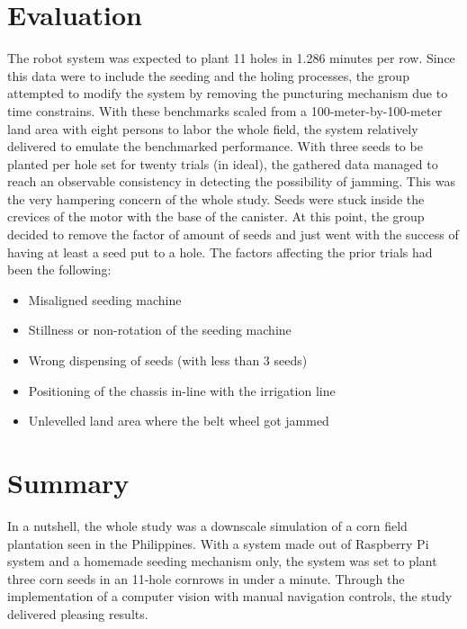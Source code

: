 \section{Evaluation}
	The robot system was expected to plant 11 holes in 1.286 minutes per row. Since this data were to include the seeding and the holing processes, the group attempted to modify the system by removing the puncturing mechanism due to time constrains. With these benchmarks scaled from a 100-meter-by-100-meter land area with eight persons to labor the whole field, the system relatively delivered to emulate the benchmarked performance. With three seeds to be planted per hole set for twenty trials (in ideal), the gathered data managed to reach an observable consistency in detecting the possibility of jamming. This was the very hampering concern of the whole study. Seeds were stuck inside the crevices of the motor with the base of the canister. At this point, the group decided to remove the factor of amount of seeds and just went with the success of having at least a seed put to a hole. The factors affecting the prior trials had been the following:

\begin{itemize}
\item {Misaligned seeding machine}
\item {Stillness or non-rotation of the seeding machine}
\item {Wrong dispensing of seeds (with less than 3 seeds)}
\item {Positioning of the chassis in-line with the irrigation line}
\item {Unlevelled land area where the belt wheel got jammed}
\end{itemize}

\section{Summary}
	In a nutshell, the whole study was a downscale simulation of a corn field plantation seen in the Philippines. With a system made out of Raspberry Pi system and a homemade seeding mechanism only, the system was set to plant three corn seeds in an 11-hole cornrows in under a minute. Through the implementation of a computer vision with manual navigation controls, the study delivered pleasing results.
